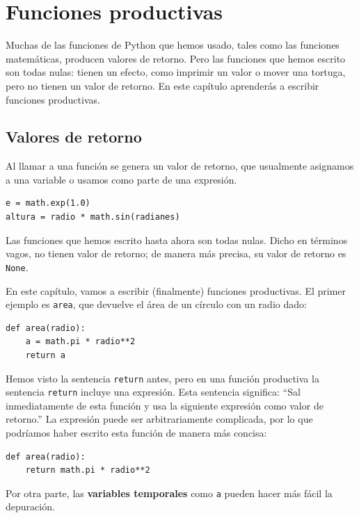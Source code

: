 \documentclass[10pt]{book}
\begin{document}
\chapter{Funciones productivas}
\label{fruitchap}

Muchas de las funciones de Python que hemos usado, tales como las funciones
matemáticas, producen valores de retorno. Pero las funciones que hemos escrito
son todas nulas: tienen un efecto, como imprimir un valor
o mover una tortuga, pero no tienen un valor de retorno.  En
este capítulo aprenderás a escribir funciones productivas.


\section{Valores de retorno}

Al llamar a una función se genera un valor de
retorno, que usualmente asignamos a una variable o usamos como parte de una
expresión.

\begin{verbatim}
e = math.exp(1.0)
altura = radio * math.sin(radianes)
\end{verbatim}
%
Las funciones que hemos escrito hasta ahora son todas nulas.  Dicho en términos vagos,
no tienen valor de retorno; de manera más precisa,
su valor de retorno es {\tt None}.

En este capítulo, vamos a escribir (finalmente) funciones productivas.
El primer ejemplo es {\tt area}, que devuelve el área de un círculo
con un radio dado:

\begin{verbatim}
def area(radio):
    a = math.pi * radio**2
    return a
\end{verbatim}
%
Hemos visto la sentencia {\tt return} antes, pero en una función
productiva la sentencia {\tt return} incluye
una expresión.  Esta sentencia significa: ``Sal inmediatamente de
esta función y usa la siguiente expresión como valor de retorno.''
La expresión puede ser arbitrariamente complicada, por lo que podríamos
haber escrito esta función de manera más concisa:

\begin{verbatim}
def area(radio):
    return math.pi * radio**2
\end{verbatim}
%
Por otra parte, las {\bf variables temporales} como {\tt a} pueden hacer
más fácil la depuración.
\end{document}
